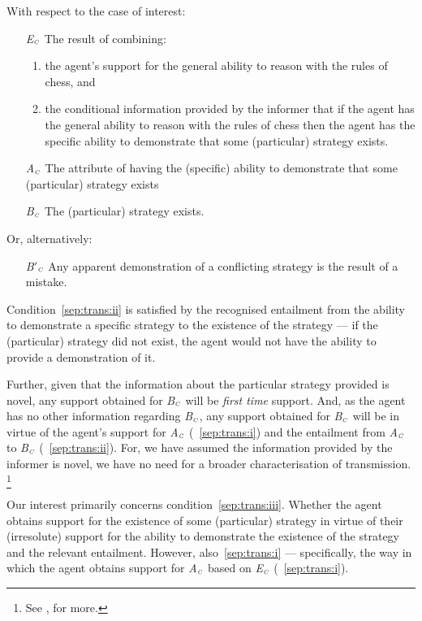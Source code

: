 \documentclass[10pt]{article}
\newcommand{\tri}[2]{\emph{#2}\(_{\text{\tiny\emph #1}}\)}
\begin{document}
\begin{note}
  With respect to the case of interest:
  \begin{transmission}[Chess]
    \begin{enumerate}
    \item[\tri{C}{E}]
      The result of combining:
      \begin{enumerate}[label=\tri{C}{E}\arabic*.]
    \item\label{C:tr:E1} the agent's support for the general ability to reason with the rules of chess, and
    \item\label{C:tr:E2} the conditional information provided by the informer that if the agent has the general ability to reason with the rules of chess then the agent has the specific ability to demonstrate that some (particular) strategy exists.
    \end{enumerate}
    \item[\tri{C}{A}] The attribute of having the (specific) ability to demonstrate that some (particular) strategy exists
    \item[\tri{C}{B}] The (particular) strategy exists.
    \end{enumerate}
    Or, alternatively:
    \begin{enumerate}
    \item[\tri{C}{B\('\)}] Any apparent demonstration of a conflicting strategy is the result of a mistake.
    \end{enumerate}
  \end{transmission}

  Condition~\ref{sep:trans:ii} is satisfied by the recognised entailment from the ability to demonstrate a specific strategy to the existence of the strategy --- if the (particular) strategy did not exist, the agent would not have the ability to provide a demonstration of it.

  Further, given that the information about the particular strategy provided is novel, any support obtained for \tri{C}{B} will be \emph{first time} support.
  And, as the agent has no other information regarding \tri{C}{B}, any support obtained for \tri{C}{B} will be in virtue of the agent's support for \tri{C}{A} (~\ref{sep:trans:i}) and the entailment from \tri{C}{A} to \tri{C}{B} (~\ref{sep:trans:ii}).
  For, we have assumed the information provided by the informer is novel, we have no need for a broader characterisation of transmission.\nolinebreak
  \footnote{
    See \textcite{Moretti:2018we,Moretti:2018tl,Moretti:2013wd}, for more.
  }

  Our interest primarily concerns condition~\ref{sep:trans:iii}.
  Whether the agent obtains support for the existence of some (particular) strategy in virtue of their (irresolute) support for the ability to demonstrate the existence of the strategy and the relevant entailment.
  However, also~\ref{sep:trans:i} --- specifically, the way in which the agent obtains support for \tri{C}{A} based on \tri{C}{E} (~\ref{sep:trans:i}).
\end{note}
\end{document}
